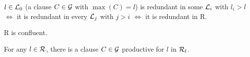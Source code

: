  \begin{lemma} \label{le:redundancy-limit}
\(l\in\mbox {$\cal L$}_0\) (a clause \(C\in \mbox {$\cal G$}\) with \(\max(C)=l\)) is
redundant in some \(\mbox {$\cal L$}_i\) with \(l_i>l\) $\Leftrightarrow$ it is redundant in every
\(\mbox {$\cal L$}_j\) with $j>i$ $\Leftrightarrow$ it is redundant in \C R.
\end{lemma}

 \begin{lemma} \label{le:model-confluent}
\C R is confluent.
\end{lemma}

\begin{lemma} \label{le:productive-clause}
For any \(l\in\mbox {$\cal R$}\), there is a clause \(C\in\mbox {$\cal G$}\) productive
for $l$ in \(\mbox {$\cal R$}_l\).
 \end{lemma}
%


